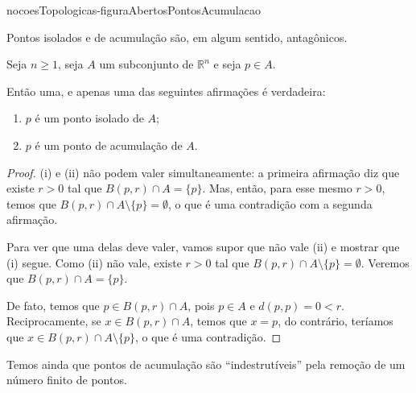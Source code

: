 {nocoesTopologicas-figuraAbertosPontosAcumulacao}

Pontos isolados e de acumulação são, em algum sentido, antagônicos.

\begin{proposition}
    Seja $n\geq 1$, seja $A$ um subconjunto de $\mathbb R^n$ e seja $p \in A$.
    
    Então uma, e apenas uma das seguintes afirmações é verdadeira:
    \begin{enumerate}[label=(\roman*)]
        \item $p$ é um ponto isolado de $A$;
        \item $p$ é um ponto de acumulação de $A$.
    \end{enumerate}
\end{proposition}
\begin{proof}
    (i) e (ii) não podem valer simultaneamente:
    a primeira afirmação diz que existe $r>0$ tal que $B(p, r)\cap A = \{p\}$.
    Mas, então, para esse mesmo $r>0$, temos que $B(p, r)\cap A\setminus\{p\} = \emptyset$, o que é uma contradição com a segunda afirmação.

    Para ver que uma delas deve valer, vamos supor que não vale (ii) e mostrar que (i) segue.
    Como (ii) não vale, existe $r>0$ tal que $B(p, r)\cap A\setminus\{p\} = \emptyset$.
    Veremos que $B(p, r)\cap A = \{p\}$.

    De fato, temos que $p \in B(p, r)\cap A$, pois $p \in A$ e $d(p, p) = 0 < r$.
    Reciprocamente, se $x \in B(p, r)\cap A$, temos que $x=p$, do contrário, teríamos que $x \in B(p, r)\cap A\setminus\{p\}$, o que é uma contradição.
\end{proof}

Temos ainda que pontos de acumulação são ``indestrutíveis'' pela remoção de um número finito de pontos.

